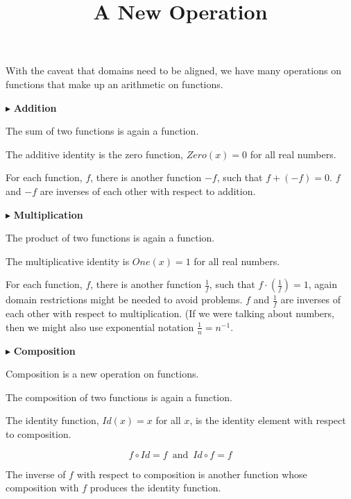 \documentclass{ximera}
\title{A New Operation}
\begin{document}
\begin{abstract}
\end{abstract}
\maketitle





With the caveat that domains need to be aligned, we have many operations on functions that make up an arithmetic on functions. 




$\blacktriangleright$ \textbf{\textcolor{blue!75!black}{Addition}}  

The sum of two functions is again a function. 

The additive identity is the zero function, $Zero(x) = 0$ for all real numbers.

For each function, $f$, there is another function $-f$, such that $f + (-f) = 0$.   $f$ and $-f$ are inverses of each other with respect to addition.




$\blacktriangleright$ \textbf{\textcolor{blue!75!black}{Multiplication}} 

The product of two functions is again a function.  

The multiplicative identity is $One(x) = 1$ for all real numbers.

For each function, $f$, there is another function $\frac{1}{f}$, such that $f \cdot \left( \frac{1}{f} \right) = 1$, again domain restrictions might be needed to avoid problems.   $f$ and $\frac{1}{f}$ are inverses of each other with respect to multiplication.  (If we were talking about numbers, then we might also use exponential notation $\frac{1}{n} = n^{-1}$.


$\blacktriangleright$ \textbf{\textcolor{blue!75!black}{Composition}} 

Composition is a new operation on functions.

The composition of two functions is again a function. 

The identity function, $Id(x) = x$ for all $x$, is the identity element with respect to composition.



\[   f \circ Id = f    \, \text{ and } \, Id \circ f = f        \]



The inverse of $f$ with respect to composition is another function whose composition with $f$ produces the identity function.
\end{document}

